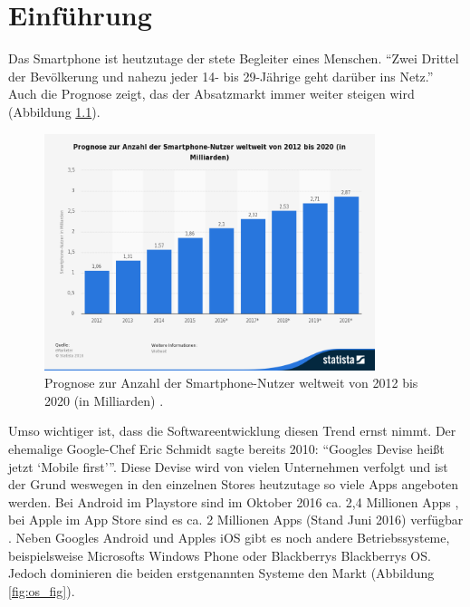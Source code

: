 \chapter{Einführung}\label{ch:intro}

Das Smartphone ist heutzutage der stete Begleiter eines Menschen. \enquote{Zwei Drittel der Bevölkerung und nahezu jeder 14- bis 29-Jährige geht darüber ins Netz.} \cite{usage} Auch die Prognose zeigt, das der Absatzmarkt immer weiter steigen wird (Abbildung \ref{fig:prognose_fig}).

\begin{figure}[H]
	\begin{center}
		\includegraphics[width=0.86\textwidth]{images/prognose-zur-anzahl-der-smartphone-nutzer-weltweit-bis-2020.png}
		\caption{Prognose zur Anzahl der Smartphone-Nutzer weltweit von 2012 bis 2020 (in Milliarden) \cite{prognose}.}
		\label{fig:prognose_fig}
	\end{center}
\end{figure}

Umso wichtiger ist, dass die Softwareentwicklung diesen Trend ernst nimmt. Der ehemalige Google-Chef Eric Schmidt sagte bereits 2010: \enquote{Googles Devise heißt jetzt \enquote{Mobile first}}. 
Diese Devise wird von vielen Unternehmen verfolgt und ist der Grund weswegen in den einzelnen Stores heutzutage so viele Apps angeboten werden. Bei Android im Playstore sind im Oktober 2016 ca. 2,4 Millionen Apps \cite{play_store}, bei Apple im App Store sind es ca. 2 Millionen Apps (Stand Juni 2016) verfügbar \cite{app_store}. Neben Googles Android und Apples iOS gibt es noch andere Betriebssysteme, beispielsweise Microsofts Windows Phone oder Blackberrys Blackberrys OS. Jedoch dominieren die beiden erstgenannten Systeme den Markt (Abbildung \ref{fig:os_fig}).

